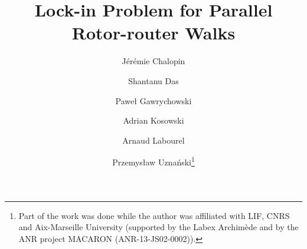 \documentclass{article}[11pt,letter]
\begin{document}
\author[1]{Jérémie Chalopin}
\author[1]{Shantanu Das}
\author[2]{Paweł Gawrychowski}
\author[3]{Adrian Kosowski}
\author[1]{Arnaud Labourel}
\author[4]{Przemys\l{}aw Uznański\thanks{Part of the work was done while the author was affiliated with LIF,  CNRS and Aix-Marseille University (supported by the Labex Archimède and by the ANR project MACARON (ANR-13-JS02-0002)).}}

\iffalse
\author{Jérémie Chalopin\inst{1}
\and
Shantanu Das\inst{1}
\and
Paweł Gawrychowski\inst{2}
\and
Adrian Kosowski\inst{3}
\and
Arnaud Labourel\inst{1}
\and
Przemys\l{}aw Uznański\inst{4}}
\fi






\date{}

\title{Lock-in Problem for Parallel Rotor-router Walks}
\maketitle
\end{document}
